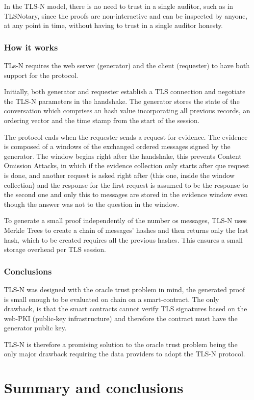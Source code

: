In the TLS-N model, there is no need to trust in a single auditor, such as in TLSNotary, since the proofs are non-interactive and can be inspected by anyone, at any point in time, without having to trust in a single auditor honesty.


\subsubsection{How it works}
TLs-N requires the web server (generator) and the client (requester) to have both support for the protocol.

Initially, both generator and requester establish a TLS connection and negotiate the TLS-N parameters in the handshake. The generator stores the state of the conversation which comprises an hash value incorporating all previous records, an ordering vector and the time stamp from the start of the session.

The protocol ends when the requester sends a request for evidence. The evidence is composed of a windows of the exchanged ordered messages signed by the generator. The window begins right after the handshake, this prevents Content Omission Attacks, in which if the evidence collection only starts after que request is done, and another request is asked right after (this one, inside the window collection) and the response for the first request is assumed to be the response to the second one and only this to messages are stored in the evidence window even though the answer was not to the question in the window.

To generate a small proof independently of the number os messages, TLS-N uses Merkle Trees to create a chain of messages' hashes and then returns only the last hash, which to be created requires all the previous hashes. This ensures a small storage overhead per TLS session.


\subsubsection{Conclusions}
TLS-N was designed with the oracle trust problem in mind, the generated proof is small enough to be evaluated on chain on a smart-contract. The only drawback, is that the smart contracts cannot verify TLS signatures based on the web-PKI (public-key infrastructure) and therefore the contract must have the generator public key.

TLS-N is therefore a promising solution to the oracle trust problem being the only major drawback requiring the data providers to adopt the TLS-N protocol.


\section{Summary and conclusions}
